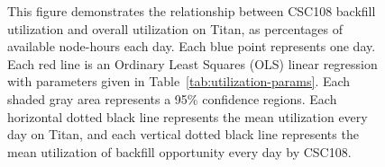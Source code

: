 \begin{figure}
  \vspace{1em}
  \caption{This figure demonstrates the relationship between CSC108 backfill
utilization and overall utilization on Titan, as percentages of available
node-hours each day. Each blue point represents one day. Each red line is an
Ordinary Least Squares (OLS) linear regression with parameters given in
Table~\ref{tab:utilization-params}. Each shaded gray area represents a 95\%
confidence regions. Each horizontal dotted black line represents the mean
utilization every day on Titan, and each vertical dotted black line represents
the mean utilization of backfill opportunity every day by CSC108.}
\end{figure}

